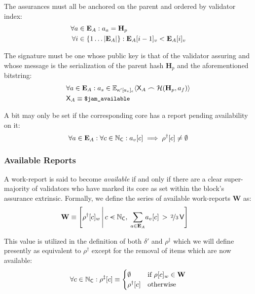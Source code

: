 The assurances must all be anchored on the parent and ordered by validator index:
\begin{align}
  \forall a &\in \mathbf{E}_A : a_a = \mathbf{H}_p \\
  \forall i &\in \{ 1\dots|\mathbf{E}_A| \} : \mathbf{E}_A[i - 1]_v < \mathbf{E}_A[i]_v
\end{align}

The signature must be one whose public key is that of the validator assuring and whose message is the serialization of the parent hash $\mathbf{H}_p$ and the aforementioned bitstring:
\begin{align}
  &\forall a \in \mathbf{E}_A : a_s \in \mathbb{E}_{\kappa'[a_v]_e}\langle\mathsf{X}_A\frown \mathcal{H}(\mathbf{H}_p, a_f)\rangle \\
  &\mathsf{X}_A \equiv \text{{\small \texttt{\$jam\_available}}}
\end{align}

A bit may only be set if the corresponding core has a report pending availability on it:
\begin{align}
  \forall a \in \mathbf{E}_A : \forall c \in \mathbb{N}_\mathsf{C} : a_v[c] \implies \rho^\dagger[c] \ne \emptyset
\end{align}

\subsubsection{Available Reports}
A work-report is said to become \emph{available} if and only if there are a clear  super-majority of validators who have marked its core as set within the block's assurance extrinsic. Formally, we define the series of available work-reports $\mathbf{W}$ as:
\begin{align}\label{eq:availableworkreports}
  \mathbf{W} &\equiv \left[\rho^\dagger[c]_w\,\middle\vert\,c \orderedin \N_\mathsf{C},\;\sum_{a \in \xtassurances}\!a_v[c]\,>\,\nicefrac{2}{3}\,\mathsf{V}\right]
\end{align}

This value is utilized in the definition of both $\delta'$ and $\rho^\ddagger$ which we will define presently as equivalent to $\rho^\dagger$ except for the removal of items which are now available:
\begin{align}
  \forall c \in \mathbb{N}_\mathsf{C}: \rho^\ddagger[c] \equiv \begin{cases}
    \emptyset &\text{if }\rho[c]_w \in \mathbf{W}\\
    \rho^\dagger[c] &\text{otherwise}
  \end{cases}
\end{align}











